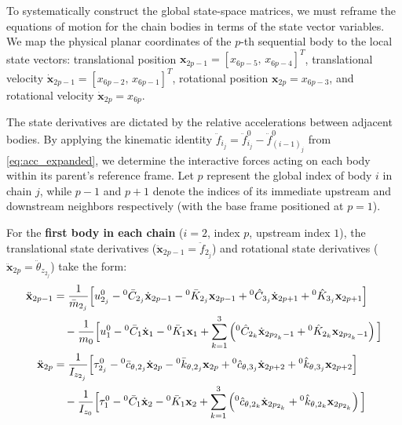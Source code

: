 To systematically construct the global state-space matrices, we must reframe the equations of motion for the chain bodies in terms of the state vector variables. We map the physical planar coordinates of the $p$-th sequential body to the local state vectors: translational position $\mathbf{x}_{2p-1} = [x_{6p-5},\, x_{6p-4}]^T$, translational velocity $\dot{\mathbf{x}}_{2p-1} = [x_{6p-2},\, x_{6p-1}]^T$, rotational position $\mathbf{x}_{2p} = x_{6p-3}$, and rotational velocity $\dot{\mathbf{x}}_{2p} = x_{6p}$.

The state derivatives are dictated by the relative accelerations between adjacent bodies. By applying the kinematic identity $\ddot{f}_{i_j} = \ddot{f}^0_{i_j} - \ddot{f}^0_{(i-1)_j}$ from \eqref{eq:acc_expanded}, we determine the interactive forces acting on each body within its parent's reference frame. Let $p$ represent the global index of body $i$ in chain $j$, while $p-1$ and $p+1$ denote the indices of its immediate upstream and downstream neighbors respectively (with the base frame positioned at $p=1$). 


For the \textbf{first body in each chain} ($i=2$, index $p$, upstream index $1$), the translational state derivatives ($\ddot{\mathbf{x}}_{2p-1} = \ddot{f}_{2_j}$) and rotational state derivatives ($\ddot{\mathbf{x}}_{2p} = \ddot{\theta}_{z_{2_j}}$) take the form:
\begin{align}
    \ddot{\mathbf{x}}_{2p-1} &= 
    \frac{1}{\bar{m}_{2_j}} \Big[ u^0_{2_j} - {}^0\bar{C}_{2_j}\dot{\mathbf{x}}_{2p-1} - {}^0\bar{K}_{2_j}\mathbf{x}_{2p-1} + {}^0\hat{C}_{3_j}\dot{\mathbf{x}}_{2p+1} + {}^0\hat{K}_{3_j}\mathbf{x}_{2p+1} \Big] \notag \\
    &\quad - \frac{1}{m_0} \Big[ u^0_1 - {}^0\bar{C}_1\dot{\mathbf{x}}_{1} - {}^0\bar{K}_1 \mathbf{x}_{1} + \sum_{k=1}^3 \left( {}^0\hat{C}_{2_k}\dot{\mathbf{x}}_{2p_{2_k}-1} + {}^0\hat{K}_{2_k}\mathbf{x}_{2p_{2_k}-1} \right) \Big] \\
    \ddot{\mathbf{x}}_{2p} &= 
    \frac{1}{I_{z_{2_j}}} \Big[ \tau^0_{2_j} - {}^0\bar{c}_{\theta,2_j}\dot{\mathbf{x}}_{2p} - {}^0\bar{k}_{\theta,2_j}\mathbf{x}_{2p} + {}^0\hat{c}_{\theta,3_j}\dot{\mathbf{x}}_{2p+2} + {}^0\hat{k}_{\theta,3_j}\mathbf{x}_{2p+2} \Big] \notag \\
    &\quad - \frac{1}{I_{z_0}} \Big[ \tau^0_1 - {}^0\bar{C}_1\dot{\mathbf{x}}_{2} - {}^0\bar{K}_1 \mathbf{x}_{2} + \sum_{k=1}^3 \left( {}^0\hat{c}_{\theta,2_k}\dot{\mathbf{x}}_{2p_{2_k}} + {}^0\hat{k}_{\theta,2_k}\mathbf{x}_{2p_{2_k}} \right) \Big]
\end{align}

